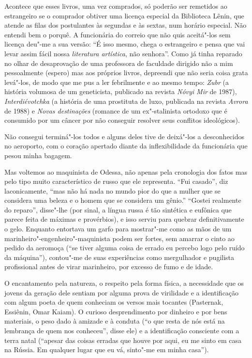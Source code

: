Acontece que esses livros, uma vez comprados, só poderão ser remetidos ao estrangeiro se o comprador obtiver uma licença especial da Biblioteca Lênin, que atende as filas dos postulantes às segundas e às sextas, num horário especial. Não entendi bem o porquê. A funcionária do correio que não quis aceitá"-los sem licença deu"-me a sua versão: ``É isso mesmo, chega o estrangeiro e pensa que vai levar assim fácil nossa \emph{literatura artística}, não senhora''. Como já tinha reparado no olhar de desaprovação de uma professora de faculdade dirigido não a mim pessoalmente (espero) mas aos próprios livros, depreendi que não seria coisa grata levá"-los, de modo que me pus a ler febrilmente e ao mesmo tempo: \emph{Zubr} (a história volumosa de um geneticista, publicado na revista \emph{Nóvyi Mir} de 1987), \emph{Interdiévotchka} (a história de uma prostituta de luxo, publicada na revista \emph{Avrora} de 1988) e \emph{Novas destinações} (romance de um ex"-stalinista ortodoxo que é consumido por um câncer por não conseguir resolver seus conflitos ideológicos).

Não consegui terminá"-los todos e alguns deles tive de deixá"-los a desconhecidos no aeroporto, com o coração apertado diante da
inflexibilidade da funcionária que pesou minha bagagem.

Mas voltemos ao maquinista de Odessa, não apenas pela cronologia dos fatos mas pelo tipo muito característico de russo que ele representa. ``Fui casado'', diz laconicamente, ``mas não há nada no mundo pior do que a mulher que se considera uma beleza e o homem que se considera um gênio.'' ``Gostei realmente do reparo'', disse"-lhe (por sinal, a língua russa é tão sintética e eufônica que parece feita de máximas e provérbios), e isso serviu para quebrar definitivamente o gelo. Enquanto entortava um garfo para mostrar"-me como as mãos de um marinheiro"-engenheiro"-maquinista podem ser fortes, sem amarrar o cinto ao pedido da aeromoça (``se tiver alguma coisa de errado eu percebo logo pelo ruído da máquina''), contou"-me de suas experiências como mergulhador e pugilista profissional antes de virar marinheiro, por excesso de fumo e de idade.

O encantamento pela natureza, o respeito pela forma física, a necessidade que os jovens da geração dele sentiam por alguma prova de
virilidade e a identificação com algum poeta de quem conheciam os versos mais tocantes (Pasternak, Essiênin, Omar Kaiam). O curioso
desprendimento por dinheiro e por bens materiais, o peso dado à amizade e à conduta (``o que resta de nós está na lembrança de quem nos conheceu'', disse ele) e a identificação consciente com a terra natal (``apesar das coisas erradas que houve por aqui, eu me sinto em casa na Rússia. Em qualquer lugar que eu vá, sinto"-me em minha casa'').

